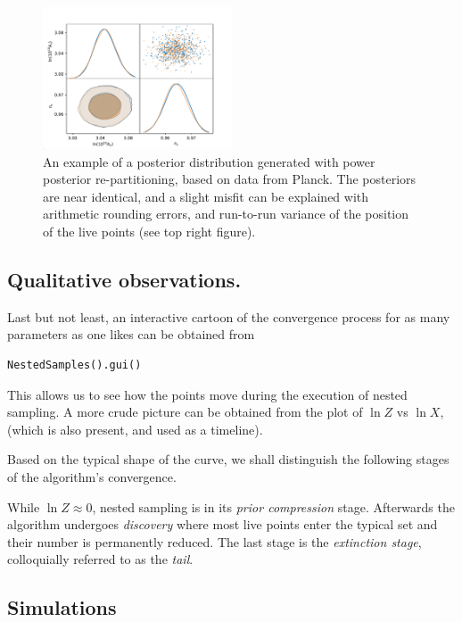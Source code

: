 \documentclass[usenatbib]{mnras}
\begin{document}
\begin{figure}
 \includegraphics[width=0.5\textwidth]{./illustrations/misfit.pdf}
\caption{An example of a posterior distribution generated with power posterior re-partitioning, based on data from Planck. The posteriors are near identical, and a slight misfit can be explained with arithmetic rounding errors, and run-to-run variance of the position of the live points (see top right figure). \label{fig:overlay-posteriors}}
\end{figure}




\subsection{Qualitative observations.}
\label{sec:org9b17424}
Last but not least, an interactive cartoon of the convergence
process for as many parameters as one likes can be obtained from

\lstset{language=Python,label= ,caption= ,captionpos=b,numbers=none}
\begin{lstlisting}
NestedSamples().gui()
\end{lstlisting}
This allows us to see how the points move during the execution of
nested sampling. A more crude picture can be obtained from the plot
of \(\ln Z\) vs \(\ln X\), (which is also present, and used as a
timeline).

Based on the typical shape of the curve, we shall distinguish the
following stages of the algorithm's convergence.

While \(\ln Z \approx 0\), nested sampling is in its \emph{prior
compression} stage.  Afterwards the algorithm undergoes \emph{discovery}
where most live points enter the typical set and their number is
permanently reduced. The last stage is the \emph{extinction stage},
colloquially referred to as the \emph{tail}.


\subsection{Simulations}
\label{sec:org78fe5bf}
\end{document}
